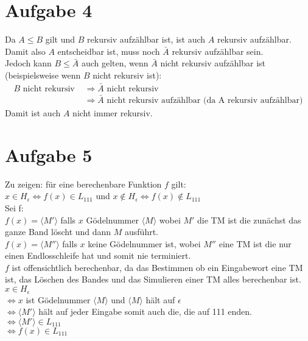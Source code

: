\documentclass[a4paper,11pt]{scrartcl}
\begin{document}
	\section*{Aufgabe 4}
	Da $A \leq B$ gilt und $B$ rekursiv aufzählbar ist, ist auch $A$ rekursiv aufzählbar.\\
	Damit also $A$ entscheidbar ist, muss noch $\bar{A}$ rekursiv aufzählbar sein.\\
	Jedoch kann $B \leq \bar{A}$ auch gelten, wenn $\bar{A}$ nicht rekursiv aufzählbar ist (beispielsweise wenn $B$ nicht rekursiv ist):
	\begin{align*}
	B \text{ nicht rekursiv } 	&\Rightarrow \bar{A} \text{ nicht rekursiv} \\
								&\Rightarrow \bar{A} \text{ nicht rekursiv aufzählbar (da A rekursiv aufzählbar)}
	\end{align*}
	Damit ist auch $A$ nicht immer rekursiv.
	
		
	\section*{Aufgabe 5}
	Zu zeigen: für eine berechenbare Funktion $f$ gilt:\\
	$x \in H_{\epsilon} \Leftrightarrow f(x) \in L_{111}$ und $x \not \in H_{\epsilon} \Leftrightarrow f(x) \not \in L_{111}$\\
	Sei f:\\
	$f(x) = \langle M' \rangle$ falls $x$ Gödelnummer $\langle M \rangle$ wobei $M'$ die TM ist die zunächst das ganze Band löscht und dann $M$ ausführt.\\
	$f(x) = \langle M'' \rangle$ falls $x$ keine Gödelnummer ist, wobei $M''$ eine TM ist die nur einen Endlosschleife hat und somit nie terminiert.\\
	$f$ ist offensichtlich berechenbar, da das Bestimmen ob ein Eingabewort eine TM ist, das Löschen des Bandes und das Simulieren einer TM alles berechenbar ist.\\

	$x \in H_{\epsilon}$\\
			   $\Leftrightarrow x$ ist Gödelnummer $\langle M \rangle$ und $\langle M \rangle$ hält auf $\epsilon$\\
			   $\Leftrightarrow \langle M' \rangle$ hält auf jeder Eingabe somit auch die, die auf 111 enden.\\
			   $\Leftrightarrow \langle M' \rangle \in L_{111}$\\
			   $\Leftrightarrow f(x) \in L_{111}$\\
\end{document}
